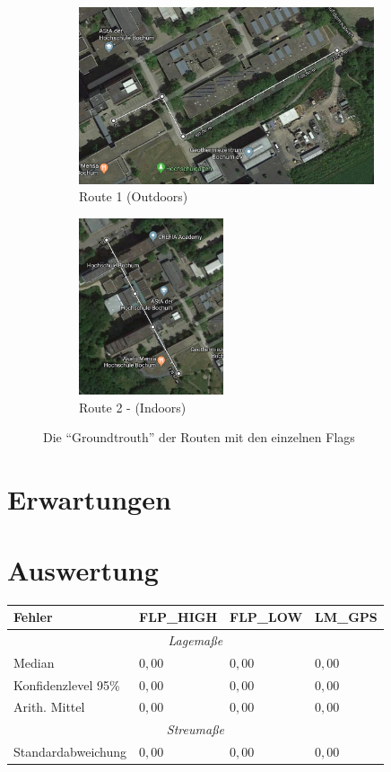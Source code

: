 \begin{figure}[h!]
	\centering
	\begin{subfigure}[b]{.64\textwidth}
		\centering
        \includegraphics[height=5.2cm]{route1}
        \caption{Route  1 (Outdoors)}
        \label{fig:route1}
    \end{subfigure}
    \begin{subfigure}[b]{.35\textwidth}
    	\centering
        \includegraphics[height=5.2cm]{route2}
        \caption{Route 2 - (Indoors)}
        \label{fig:route2}
    \end{subfigure}
    \caption{Die "`Groundtrouth"' der Routen mit den einzelnen Flags}
    \label{fig:routen}
\end{figure}

\section{Erwartungen}
	
\section{Auswertung}	

\renewcommand{\arraystretch}{1.2}
\begin{tabular}{|l|l|l|l|}
\hline
Fehler & FLP\_HIGH & FLP\_LOW & LM\_GPS \\
\hline
\multicolumn{4}{|c|}{\textit{Lagemaße}}\\
\hline
Median & $0,00$ & $0,00$ & $0,00$ \\
Konfidenzlevel 95\% & $0,00$ & $0,00$ & $0,00$ \\
Arith. Mittel & $0,00$ & $0,00$ & $0,00$ \\
\hline
\multicolumn{4}{|c|}{\textit{Streumaße}}\\
\hline
Standardabweichung & $0,00$ & $0,00$ & $0,00$ \\
\hline
\end{tabular}
	
